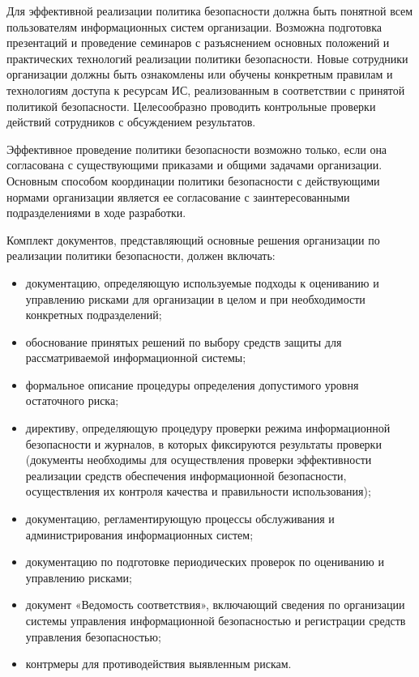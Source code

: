 Для эффективной реализации политика безопасности должна быть понятной всем пользователям информационных
систем организации. Возможна подготовка презентаций и проведение семинаров с разъяснением основных положений
и практических технологий реализации политики безопасности. Новые сотрудники организации должны быть ознакомлены
или обучены конкретным правилам и технологиям доступа к ресурсам ИС, реализованным в соответствии с принятой
политикой безопасности. Целесообразно проводить контрольные проверки действий сотрудников с обсуждением результатов.

Эффективное проведение политики безопасности возможно только, если она согласована с существующими приказами
и общими задачами организации. Основным способом координации политики безопасности с действующими нормами
организации является ее согласование с заинтересованными подразделениями в ходе разработки.

Комплект документов, представляющий основные решения организации по реализации политики безопасности,
должен включать:
\begin{itemize}
    \item
        документацию, определяющую используемые подходы к оцениванию и управлению рисками для
        организации в целом и при необходимости конкретных подразделений;

    \item
        обоснование принятых решений по выбору средств защиты для рассматриваемой информационной системы;

    \item
        формальное описание процедуры определения допустимого уровня остаточного риска;

    \item
        директиву, определяющую процедуру проверки режима информационной безопасности и журналов,
        в которых фиксируются результаты проверки (документы необходимы для осуществления проверки
        эффективности реализации средств обеспечения информационной безопасности, осуществления
        их контроля качества и правильности использования);

    \item
        документацию, регламентирующую процессы обслуживания и администрирования информационных систем;

    \item
        документацию по подготовке периодических проверок по оцениванию и управлению рисками;

    \item
        документ «Ведомость соответствия», включающий сведения по организации системы управления
        информационной безопасностью и регистрации средств управления безопасностью;

    \item
        контрмеры для противодействия выявленным рискам.
\end{itemize}

